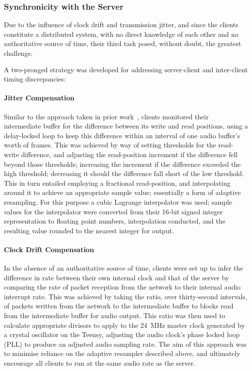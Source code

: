 \subsubsection{Synchronicity with the Server}\label{subsubsec:client-sync}

Due to the influence of clock drift and transmission jitter, and since the
clients constitute a distributed system, with no direct knowledge of each other
and no authoritative source of time, their third task posed, without doubt,
the greatest challenge.

A two-pronged strategy was developed for addressing server-client and
inter-client timing discrepancies:

\paragraph{Jitter Compensation}
Similar to the approach taken in prior
work~\citep{rushton_microcontroller-based_2023}, clients monitored their
intermediate buffer for the difference between its write and read positions,
using a delay-locked loop to keep this difference within an interval of
one audio buffer's worth of frames.
This was achieved by way of setting thresholds for the read-write difference,
and adjusting the read-position increment if the difference fell beyond those
thresholds;
increasing the increment if the difference exceeded the high threshold;
decreasing it should the difference fall short of the low threshold.
This in turn entailed employing a fractional read-position, and interpolating
around it to achieve an appropriate sample value; essentially a form of adaptive
resampling.
For this purpose a cubic Lagrange interpolator was used; sample values for the
interpolator were converted from their 16-bit signed integer representation
to floating point numbers, interpolation conducted, and the resulting value
rounded to the nearest integer for output.

\paragraph{Clock Drift Compensation}
In the absence of an authoritative source of time, clients were set up to infer
the difference in rate between their own internal clock and that of the server
by comparing the rate of packet reception from the network to their internal
audio interrupt rate.
This was achieved by taking the ratio, over thirty-second intervals, of
packets written from the network to the intermediate buffer to blocks read
from the intermediate buffer for audio output.
This ratio was then used to calculate appropriate divisors to apply to the
\qty{24}{\MHz} master clock generated by a crystal oscillator on the Teensy,
adjusting the audio clock's phase locked loop (PLL) to produce an adjusted audio
sampling rate.
The aim of this approach was to minimise reliance on the adaptive resampler
described above, and ultimately encourage all clients to run at the same audio
rate as the server.

